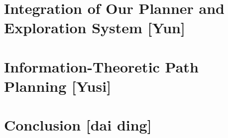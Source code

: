 \documentclass{article}
\begin{document}
\section{Integration of Our Planner and Exploration System [Yun]}

\section{Information-Theoretic Path Planning [Yusi]}

\section{Conclusion [dai ding]}

  


\begin{thebibliography}{1}

\end{thebibliography}


\end{document}
